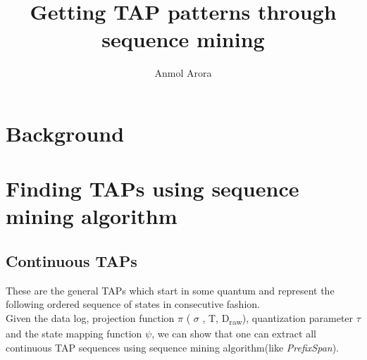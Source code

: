 \documentclass{article}
\title{Getting TAP patterns through sequence mining}
\author{Anmol Arora}
\begin{document}
\maketitle

\section{Background}


\section{Finding TAPs using sequence mining algorithm}
\subsection{Continuous TAPs}
These are the general TAPs which start in some quantum and represent the following ordered sequence of states in consecutive fashion.\\
Given the data log, projection function $\pi$ ( $\sigma$ , T, D\textsubscript{raw}), quantization parameter $\tau$ and the state mapping function $\psi$, we can show that one can extract all continuous TAP sequences using sequence mining algorithm(like \textit{PrefixSpan}).\\
\end{document}
